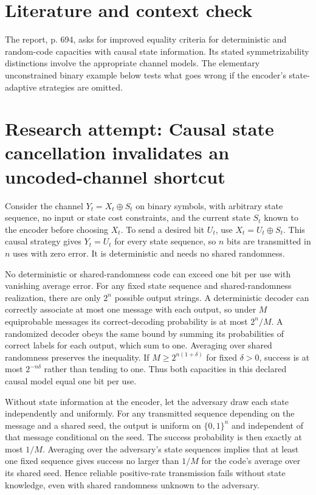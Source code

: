 \documentclass[11pt]{article}
\begin{document}
\section{Literature and context check}
The report, p. 694, asks for improved equality criteria for deterministic and random-code capacities with causal state information. Its stated symmetrizability distinctions involve the appropriate channel models. The elementary unconstrained binary example below tests what goes wrong if the encoder's state-adaptive strategies are omitted.
\section{Research attempt: Causal state cancellation invalidates an uncoded-channel shortcut}
Consider the channel $Y_t=X_t\oplus S_t$ on binary symbols, with arbitrary state sequence, no input or state cost constraints, and the current state $S_t$ known to the encoder before choosing $X_t$. To send a desired bit $U_t$, use $X_t=U_t\oplus S_t$. This causal strategy gives $Y_t=U_t$ for every state sequence, so $n$ bits are transmitted in $n$ uses with zero error. It is deterministic and needs no shared randomness.

No deterministic or shared-randomness code can exceed one bit per use with vanishing average error. For any fixed state sequence and shared-randomness realization, there are only $2^n$ possible output strings. A deterministic decoder can correctly associate at most one message with each output, so under $M$ equiprobable messages its correct-decoding probability is at most $2^n/M$. A randomized decoder obeys the same bound by summing its probabilities of correct labels for each output, which sum to one. Averaging over shared randomness preserves the inequality. If $M\ge2^{n(1+\delta)}$ for fixed $\delta>0$, success is at most $2^{-n\delta}$ rather than tending to one. Thus both capacities in this declared causal model equal one bit per use.

Without state information at the encoder, let the adversary draw each state independently and uniformly. For any transmitted sequence depending on the message and a shared seed, the output is uniform on $\{0,1\}^n$ and independent of that message conditional on the seed. The success probability is then exactly at most $1/M$. Averaging over the adversary's state sequences implies that at least one fixed sequence gives success no larger than $1/M$ for the code's average over its shared seed. Hence reliable positive-rate transmission fails without state knowledge, even with shared randomness unknown to the adversary.
\end{document}
